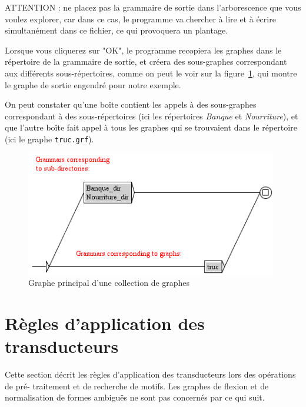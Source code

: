 \bigskip
\noindent ATTENTION : ne placez pas la grammaire de sortie dans l’arborescence que vous
voulez explorer, car dans ce cas, le programme va chercher à lire et à écrire simultanément
dans ce fichier, ce qui provoquera un plantage.


\bigskip
\noindent Lorsque vous cliquerez sur "OK", le programme recopiera les graphes dans le répertoire de
la grammaire de sortie, et créera des sous-graphes correspondant aux différents
sous-répertoires, comme on peut le voir sur la figure~\ref{fig-graph-collection}, qui montre
le graphe de sortie engendré pour notre exemple.


\bigskip
\noindent On peut constater qu’une boîte contient les appels à des
sous-graphes correspondant à des sous-répertoires (ici les répertoires \textit{Banque}
et \textit{Nourriture}), et que l’autre boîte fait appel à tous les graphes qui se trouvaient
dans le répertoire (ici le graphe \texttt{truc.grf}).

\begin{figure}[!h]
\begin{center}
\includegraphics[width=11cm]{resources/img/fig6-21.png}
\caption{Graphe principal d’une collection de graphes\label{fig-graph-collection}}
\end{center}
\end{figure}



\section{Règles d’application des transducteurs}
\label{section-applying-transducers-rules}
Cette section décrit les règles d’application des transducteurs lors des opérations de pré-
traitement et de recherche de motifs. Les graphes de flexion et de normalisation de formes
ambiguës ne sont pas concernés par ce qui suit.


